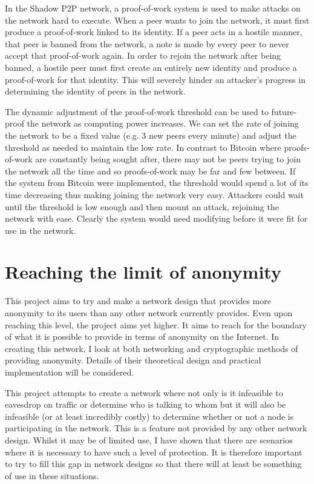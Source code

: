 \documentclass[ %
                    author={Luke Murray},
                supervisor={Dr. Simon Hollis},
                     title={Shadow Peer-to-Peer Networks},
                  subtitle={},
                    degree={MEng},
                      year={2013} ]{thesis}
\begin{document}
In the Shadow P2P network, a proof-of-work system is used to make attacks on the network hard to execute. When a peer wants to join the network, it must first produce a proof-of-work linked to its identity. If a peer acts in a hostile manner, that peer is banned from the network, a note is made by every peer to never accept that proof-of-work again. In order to rejoin the network after being banned, a hostile peer must first create an entirely new identity and produce a proof-of-work for that identity. This will severely hinder an attacker's progress in determining the identity of peers in the network.

The dynamic adjustment of the proof-of-work threshold can be used to future-proof the network as computing power increases. We can set the rate of joining the network to be a fixed value (e.g. 3 new peers every minute) and adjust the threshold as needed to maintain the low rate. In contrast to Bitcoin where proofs-of-work are constantly being sought after, there may not be peers trying to join the network all the time and so proofs-of-work may be far and few between. If the system from Bitcoin were implemented, the threshold would spend a lot of its time decreasing thus making joining the network very easy. Attackers could wait until the threshold is low enough and then mount an attack, rejoining the network with ease. Clearly the system would need modifying before it were fit for use in the network.


\section{Reaching the limit of anonymity}

This project aims to try and make a network design that provides more anonymity to its users than any other network currently provides. Even upon reaching this level, the project aims yet higher. It aims to reach for the boundary of what it is possible to provide in terms of anonymity on the Internet. In creating this network, I look at both networking and cryptographic methods of providing anonymity. Details of their theoretical design and practical implementation will be considered.

This project attempts to create a network where not only is it infeasible to eavesdrop on traffic or determine who is talking to whom but it will also be infeasible (or at least incredibly costly) to determine whether or not a node is participating in the network. This is a feature not provided by any other network design. Whilst it may be of limited use, I have shown that there are scenarios where it is necessary to have such a level of protection. It is therefore important to try to fill this gap in network designs so that there will at least be something of use in these situations.
\end{document}
